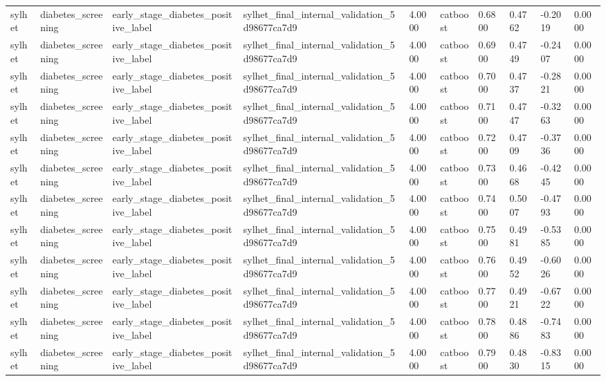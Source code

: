 \begin{tabular}{llllllllll}
sylhet & diabetes\_screening & early\_stage\_diabetes\_positive\_label & sylhet\_final\_internal\_validation\_5d98677ca7d9 & 4.0000 & catboost & 0.6800 & 0.4762 & -0.2019 & 0.0000 \\
sylhet & diabetes\_screening & early\_stage\_diabetes\_positive\_label & sylhet\_final\_internal\_validation\_5d98677ca7d9 & 4.0000 & catboost & 0.6900 & 0.4749 & -0.2407 & 0.0000 \\
sylhet & diabetes\_screening & early\_stage\_diabetes\_positive\_label & sylhet\_final\_internal\_validation\_5d98677ca7d9 & 4.0000 & catboost & 0.7000 & 0.4737 & -0.2821 & 0.0000 \\
sylhet & diabetes\_screening & early\_stage\_diabetes\_positive\_label & sylhet\_final\_internal\_validation\_5d98677ca7d9 & 4.0000 & catboost & 0.7100 & 0.4747 & -0.3263 & 0.0000 \\
sylhet & diabetes\_screening & early\_stage\_diabetes\_positive\_label & sylhet\_final\_internal\_validation\_5d98677ca7d9 & 4.0000 & catboost & 0.7200 & 0.4709 & -0.3736 & 0.0000 \\
sylhet & diabetes\_screening & early\_stage\_diabetes\_positive\_label & sylhet\_final\_internal\_validation\_5d98677ca7d9 & 4.0000 & catboost & 0.7300 & 0.4668 & -0.4245 & 0.0000 \\
sylhet & diabetes\_screening & early\_stage\_diabetes\_positive\_label & sylhet\_final\_internal\_validation\_5d98677ca7d9 & 4.0000 & catboost & 0.7400 & 0.5007 & -0.4793 & 0.0000 \\
sylhet & diabetes\_screening & early\_stage\_diabetes\_positive\_label & sylhet\_final\_internal\_validation\_5d98677ca7d9 & 4.0000 & catboost & 0.7500 & 0.4981 & -0.5385 & 0.0000 \\
sylhet & diabetes\_screening & early\_stage\_diabetes\_positive\_label & sylhet\_final\_internal\_validation\_5d98677ca7d9 & 4.0000 & catboost & 0.7600 & 0.4952 & -0.6026 & 0.0000 \\
sylhet & diabetes\_screening & early\_stage\_diabetes\_positive\_label & sylhet\_final\_internal\_validation\_5d98677ca7d9 & 4.0000 & catboost & 0.7700 & 0.4921 & -0.6722 & 0.0000 \\
sylhet & diabetes\_screening & early\_stage\_diabetes\_positive\_label & sylhet\_final\_internal\_validation\_5d98677ca7d9 & 4.0000 & catboost & 0.7800 & 0.4886 & -0.7483 & 0.0000 \\
sylhet & diabetes\_screening & early\_stage\_diabetes\_positive\_label & sylhet\_final\_internal\_validation\_5d98677ca7d9 & 4.0000 & catboost & 0.7900 & 0.4830 & -0.8315 & 0.0000 \\

\end{tabular}
